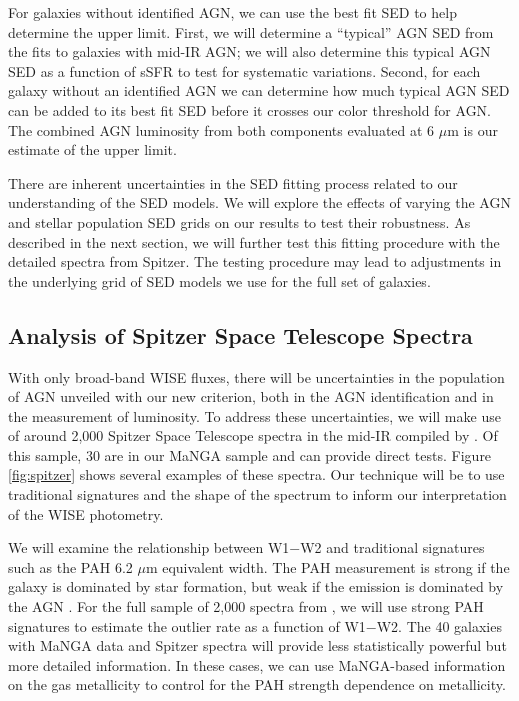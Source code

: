 \documentclass[12pt, preprint]{hacked-aastex}
\begin{document}
For galaxies without identified AGN, we can use the best fit SED to
help determine the upper limit. First, we will determine a ``typical''
AGN SED from the fits to galaxies with mid-IR AGN; we will also
determine this typical AGN SED as a function of sSFR to test for
systematic variations. Second, for each galaxy without an identified
AGN we can determine how much typical AGN SED can be added to its
best fit SED before it crosses our color threshold for AGN. The combined
AGN luminosity from both components evaluated at 6 $\mu$m is our 
estimate of the upper limit.

There are inherent uncertainties in the SED fitting process related
to our understanding of the SED models. We will explore the
effects of varying the AGN and stellar population SED grids on our
results to test their robustness.  As described in the next section,
we will further test this fitting procedure with the detailed spectra
from Spitzer. The testing procedure may lead to adjustments in the
underlying grid of SED models we use for the full set of galaxies.


\subsection{Analysis of Spitzer Space Telescope Spectra}
\label{sec:spitzer}

With only broad-band WISE fluxes, there will be uncertainties in the
population of AGN unveiled with our new criterion, both in the AGN
identification and in the measurement of luminosity. To address these
uncertainties, we will make use of around 2,000 Spitzer Space
Telescope spectra in the mid-IR compiled by \cite{lambrides}. Of this
sample, 30 are in our MaNGA sample and can provide direct tests.
Figure \ref{fig:spitzer} shows several examples of these spectra.  Our
technique will be to use traditional signatures and the shape of the
spectrum to inform our interpretation of the WISE photometry.

We will examine the relationship between W1$-$W2 and traditional
signatures such as the PAH 6.2 $\mu$m equivalent width. The PAH
measurement is strong if the galaxy is dominated by star formation,
but weak if the emission is dominated by the AGN \cite{sajina22a}.
For the full sample of 2,000 spectra from \cite{lambrides}, we will
use strong PAH signatures to estimate the outlier rate as a function
of W1$-$W2.  The 40 galaxies with MaNGA data and Spitzer spectra will
provide less statistically powerful but more detailed information. In
these cases, we can use MaNGA-based information on the gas metallicity
to control for the PAH strength dependence on metallicity.
\end{document}
